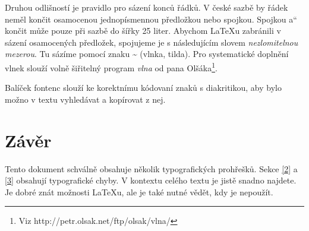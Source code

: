 \documentclass[czech,a4paper,10pt,twocolumn]{article}
\newcommand{\myuv}[1]{\quotedblbase#1\textquotedblleft}
\begin{document}
Druhou odlišností je pravidlo pro sázení konců řádků. V české sazbě by řádek neměl končit osamocenou jednopísmennou předložkou nebo spojkou. Spojkou \myuv{a} končit může pouze při sazbě do šířky 25 liter. Abychom {\LaTeX}u zabránili v sázení osamocených předložek, spojujeme je s následujícím slovem \emph{nezlomitelnou mezerou}. Tu sázíme pomocí znaku {\bfseries \textasciitilde} (vlnka, tilda). Pro systematické doplnění vlnek slouží volně šiřitelný program \emph{vlna} od pana Olšáka\footnote[2]{Viz http://petr.olsak.net/ftp/olsak/vlna/}.

Balíček {\ttfamily fontenc} slouží ke korektnímu kódovaní znaků s diakritikou, aby bylo možno v textu vyhledávat a kopírovat z nej.

\section{Závěr}

Tento dokument schválně obsahuje několik typografických prohřešků. Sekce \ref{2} a \ref{3} obsahují typografické chyby. V kontextu celého textu je jistě snadno najdete. Je dobré znát možnosti {\LaTeX}u, ale je také nutné vědět, kdy je nepoužít.
\end{document}
